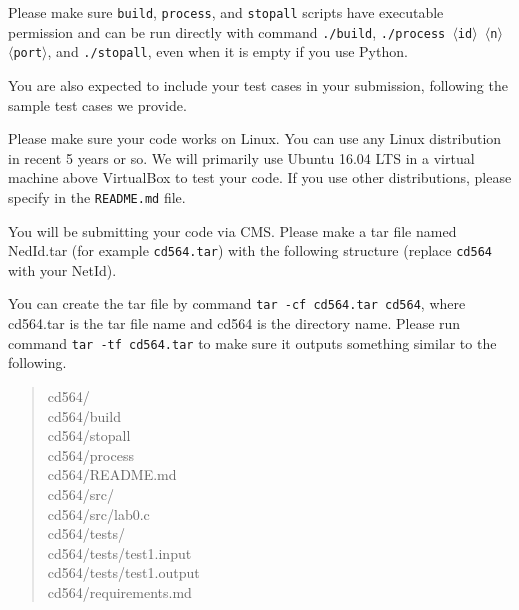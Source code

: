 \documentclass[11pt]{article}
\begin{document}
\begin{compactitem}
\begin{compactitem}
            \item Please make sure \texttt{build}, \texttt{process}, and \texttt{stopall} scripts have executable permission and can be run directly with command \texttt{./build}, \texttt{./process    $\langle$id$\rangle$ $\langle$n$\rangle$ $\langle$port$\rangle$}, and \texttt{./stopall}, even when it is empty if you use Python.
        \end{compactitem}

        \item You are also expected to include your test cases in your submission, following the sample test cases we provide.

        \item Please make sure your code works on Linux.
        You can use any Linux distribution in recent 5 years or so.
        We will primarily use Ubuntu 16.04 LTS in a virtual machine above VirtualBox to test your code.
        If you use other distributions, please specify in the \texttt{README.md} file.

    \end{compactitem}

    You will be submitting your code via CMS.
    Please make a tar file named NedId.tar (for example \texttt{cd564.tar}) with the following structure (replace \texttt{cd564} with your NetId).


    You can create the tar file by command \texttt{tar -cf cd564.tar cd564}, where cd564.tar is the tar file name and cd564 is the directory name.
    Please run command \texttt{tar -tf cd564.tar} to make sure it outputs something similar to the following.

    \begin{quote}
        cd564/\\
        cd564/build\\
        cd564/stopall\\
        cd564/process\\
        cd564/README.md\\
        cd564/src/\\
        cd564/src/lab0.c\\
        cd564/tests/\\
        cd564/tests/test1.input\\
        cd564/tests/test1.output\\
        cd564/requirements.md\\
    \end{quote}
\end{document}
